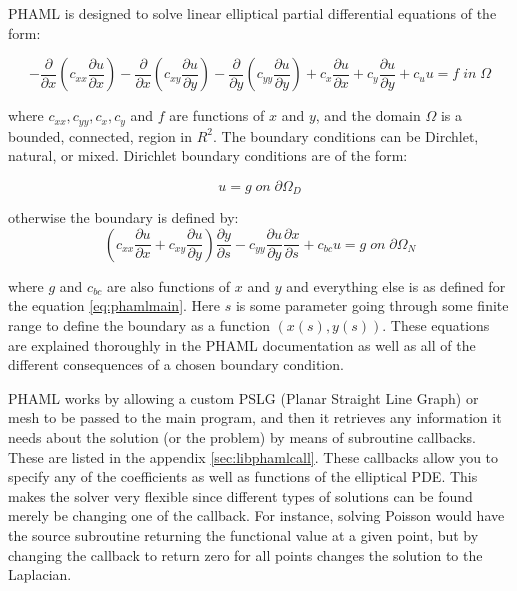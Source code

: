 PHAML is designed to solve linear elliptical partial differential equations of the form:

\begin{equation}
    - \frac{\partial}{\partial x} \left (c_{xx}\frac{\partial u}{\partial x} \right ) - \frac{\partial}{\partial x} \left (c_{xy}\frac{\partial u}{\partial y} \right ) - \frac{\partial}{\partial y} \left (c_{yy}\frac{\partial u}{\partial y} \right ) + c_x \frac{\partial u}{\partial x} + c_y \frac{\partial u}{\partial y} + c_{u}u = f \; in \; \Omega
\label{eq:phamlmain}
\end{equation}

where $c_{xx},c_{yy},c_x,c_y$ and $f$ are functions of $x$ and $y$, and the domain $\Omega$ is a bounded, connected, region in $R^2$.\citep{phamldoc}  The boundary conditions can be Dirchlet, natural, or mixed.  Dirichlet boundary conditions are of the form:

\begin{equation}
u=g \; on \; \partial \Omega_D
\label{eq:dirbound}    
\end{equation}

otherwise the boundary is defined by:
\begin{equation}
    \left ( c_{xx} \frac{\partial u}{\partial x} + c_{xy}\frac{\partial u}{\partial y} \right ) \frac{\partial y}{\partial s} - c_{yy} \frac{\partial u}{\partial y} \frac{\partial x}{\partial s} + c_{bc}u = g \; on \; \partial \Omega_N
\label{eq:phamlbound}
\end{equation}

where $g$ and $c_{bc}$ are also functions of $x$ and $y$ and everything else is as defined for the equation \eqref{eq:phamlmain}.  Here $s$ is some parameter going through some finite range to define the boundary as a function $(x(s),y(s))$.  These equations are explained thoroughly in the PHAML documentation as well as all of the different consequences of a chosen boundary condition. \citep{phamldoc}



PHAML works by allowing a custom PSLG (Planar Straight Line Graph) or mesh to be passed to the main program, and then it retrieves any information it needs about the solution (or the problem) by means of subroutine callbacks. These are listed in the appendix \ref{sec:libphamlcall}.  These callbacks allow you to specify any of the coefficients as well as functions of the elliptical PDE.  This makes the solver very flexible since different types of solutions can be found merely be changing one of the callback.  For instance, solving Poisson would have the source subroutine returning the functional value at a given point, but by changing the callback to return zero for all points changes the solution to the Laplacian.

